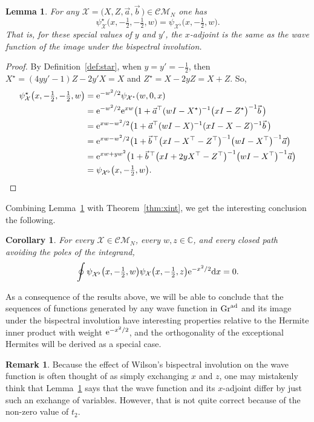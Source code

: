 \documentclass[pdftex]{sigma}
\numberwithin{equation}{section}
\newtheorem{Corollary}[Theorem]{Corollary}
\newtheorem{Lemma}[Theorem]{Lemma}
\theoremstyle{definition}
\newtheorem{Remark}[Theorem]{Remark}
\def\psistar{\psi^{\star}}
\def\X{\mathcal{X}}
\def\CM{\mathcal{C\!M}}
\begin{document}
\begin{Lemma}\label{lem:starbisp}
 For any $\X=\bigl(X,Z,\vec a,\vec b\,\bigr)\in\CM_N$ one has
 \[
 \psistar_{\X}\bigl(x,-\tfrac{1}{2},-\tfrac{1}{2},w\bigr)=\psi_{\X^{\flat}}\bigl(x,-\tfrac{1}{2},w\bigr).
 \]
 That is, for these special values of $y$ and $y'$, the $x$-adjoint
 is the same as the wave function of the image under the bispectral involution.
\end{Lemma}
\begin{proof}
By Definition~\ref{def:star}, when $y=y'=-\tfrac{1}{2}$, then
$X^{\star}=(4yy'-1)Z-2y'X=X$ and $Z^{\star}=X-2yZ=X+Z$. So,
\begin{align*}
\psistar_{\X}\bigl(x,-\tfrac{1}{2},-\tfrac{1}{2},w\bigr)&={\rm e}^{-w^2/2}\psi_{\X^{\star}}(w,0,x)\\
&={\rm e}^{-w^2/2}{\rm e}^{xw}\bigl(1+\vec
 a^{\top}(wI-X^{\star})^{-1}\bigl(xI-Z^{\star}\bigr)^{-1}\vec b\,\bigr)\\
&={\rm e}^{xw-w^2/2}\bigl(1+\vec
 a^{\top}(wI-X)^{-1}(xI-X-Z)^{-1}\vec b\,\bigr)\\
&={\rm e}^{xw-w^2/2}\bigl(1+\vec
 b^{\,\top}\bigl(xI-X^{\top}-Z^{\top}\bigr)^{-1}\bigl(wI-X^{\top}\bigr)^{-1}\vec a\bigr)\\
&={\rm e}^{xw+yw^2}\bigl(1+\vec b^{\,\top}\bigl(xI+2yX^{\top}-Z^{\top}\bigr)^{-1}\bigl(wI-X^{\top}\bigr)^{-1}\vec a\bigr)\\
&=
\psi_{\X^{\flat}}\bigl(x,-\tfrac{1}{2},w\bigr).\tag*{\qed}
\end{align*}\renewcommand{\qed}{}
\end{proof}

Combining Lemma~\ref{lem:starbisp} with Theorem~\ref{thm:xint}, we get
the interesting conclusion the following.
\begin{Corollary}
 For every $\X\in\CM_N$, every $w,z\in\mathbb{C}$, and every closed
 path avoiding the poles of the integrand,
 \[
 \oint \psi_{\X^{\flat}}\bigl(x,-\tfrac{1}{2},w\bigr)\psi_{\X}\bigl(x,-\tfrac{1}{2},z\bigr){\rm e}^{-x^2/2}{\rm d}x=0.
 \]
 \end{Corollary}


As a consequence of the results above, we will be able to conclude
that the sequences of functions generated by any wave function in
${\rm Gr}^{\rm ad}$ and its image under the bispectral involution have
interesting properties relative to the Hermite inner product with
weight ${\rm e}^{-x^2/2}$, and the orthogonality of the exceptional Hermites
will be derived as a special case.


\begin{Remark}
Because the effect of Wilson's bispectral involution on the wave
function is often thought of as simply exchanging $x$ and $z$, one may
mistakenly think that Lemma~\ref{lem:starbisp} says that the wave
function and its $x$-adjoint differ by just such an exchange of
variables. However, that is not quite correct because of the non-zero
value of $t_2$.
\end{Remark}
\end{document}
